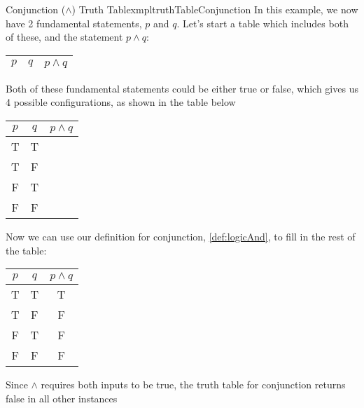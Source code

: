 \begin{exmpl}[label={exmpl:truthTableConjunction}]{Conjunction ($\land$) Truth Table}{xmpltruthTableConjunction}
    In this example, we now have 2 fundamental statements, $p$ and $q$. Let's start a table which includes both of these, and the statement $p \land q$:
    \begin{center}
        \begin{tabular}{|c|c|c|}
            \hline
            $p$ & $q$ & $p \land q$ \\
            \hline
        \end{tabular}
    \end{center}
    Both of these fundamental statements could be either true or false, which gives us 4 possible configurations, as shown in the table below
    \begin{center}
        \begin{tabular}{|c|c|c|}
            \hline
            $p$ & $q$ & $p \land q$ \\
            \hline
            T   & T   &             \\
            \hline
            T   & F   &             \\
            \hline
            F   & T   &             \\
            \hline
            F   & F   &             \\
            \hline
        \end{tabular}
    \end{center}
    \vspace{0.5cm}
    Now we can use our definition for conjunction, \cref{def:logicAnd}, to fill in the rest of the table:
    \begin{center}
        \begin{tabular}{|c|c|c|}
            \hline
            $p$ & $q$ & $p \land q$ \\
            \hline
            T   & T   & T           \\
            \hline
            T   & F   & F           \\
            \hline
            F   & T   & F           \\
            \hline
            F   & F   & F           \\
            \hline
        \end{tabular}
    \end{center}
    \vspace{0.5cm}
    Since $\land$ requires both inputs to be true, the truth table for conjunction returns false in all other instances
\end{exmpl}

